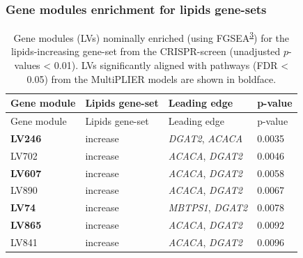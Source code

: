 \documentclass[
  a4paper,
]{article}
\newenvironment{tablenos:tagged-table}[1][]{
  \let\oldtablename\tablename
  \renewcommand{\tablename}{Supplementary Table}
}{
  \let\tablename\oldtablename
}
\begin{document}
\clearpage

\hypertarget{gene-modules-enrichment-for-lipids-gene-sets}{%
\subsubsection{Gene modules enrichment for lipids gene-sets}\label{gene-modules-enrichment-for-lipids-gene-sets}}

\begin{tablenos:tagged-table}[S1]

\begin{longtable}[]{@{}llll@{}}
\caption{Gene modules (LVs) nominally enriched (using FGSEA\textsuperscript{\protect\hyperlink{ref-Z8WXLD67}{3}}) for the lipids-increasing gene-set from the CRISPR-screen (unadjusted \(p\)-values \textless{} 0.01).
LVs significantly aligned with pathways (FDR \textless{} 0.05) from the MultiPLIER models are shown in boldface.
\label{tbl:sup:lipids_crispr:modules_enriched_increase}}\label{tbl:sup:lipids_crispr:modules_enriched_increase}\tabularnewline
\toprule()
Gene module & Lipids gene-set & Leading edge & p-value \\
\midrule()
\endfirsthead
\toprule()
Gene module & Lipids gene-set & Leading edge & p-value \\
\midrule()
\endhead
\textbf{LV246} & increase & \emph{DGAT2}, \emph{ACACA} & 0.0035 \\
LV702 & increase & \emph{ACACA}, \emph{DGAT2} & 0.0046 \\
\textbf{LV607} & increase & \emph{ACACA}, \emph{DGAT2} & 0.0058 \\
LV890 & increase & \emph{ACACA}, \emph{DGAT2} & 0.0067 \\
\textbf{LV74} & increase & \emph{MBTPS1}, \emph{DGAT2} & 0.0078 \\
\textbf{LV865} & increase & \emph{ACACA}, \emph{DGAT2} & 0.0092 \\
LV841 & increase & \emph{ACACA}, \emph{DGAT2} & 0.0096 \\
\bottomrule()
\end{longtable}

\end{tablenos:tagged-table}
\end{document}
